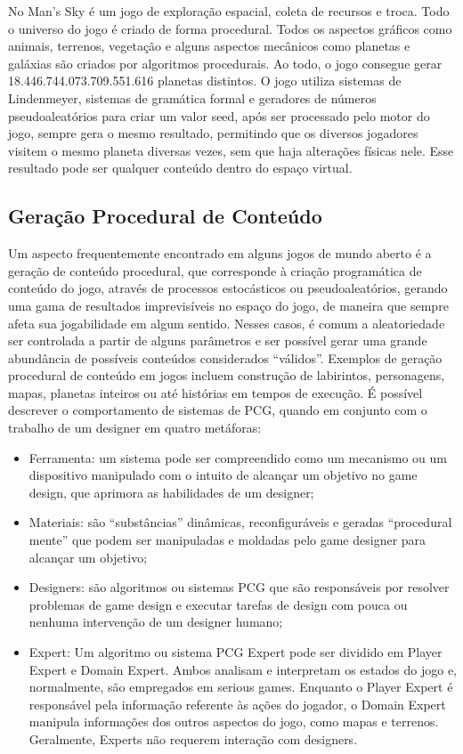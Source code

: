 \documentclass[12pt]{article}
\begin{document}
No Man’s Sky é um jogo de exploração espacial, coleta de recursos e troca. Todo o universo do jogo é criado de forma procedural. Todos os aspectos gráficos como animais, terrenos, vegetação e alguns aspectos mecânicos como planetas e galáxias são criados por algoritmos procedurais. Ao todo, o jogo consegue gerar 18.446.744.073.709.551.616 planetas distintos. O jogo utiliza sistemas de Lindenmeyer, sistemas de gramática formal e geradores de números pseudoaleatórios para criar um valor seed, após ser processado pelo motor do jogo, sempre gera o mesmo resultado, permitindo que os diversos jogadores visitem o mesmo planeta diversas vezes, sem que haja alterações físicas nele. Esse resultado pode ser qualquer conteúdo dentro do espaço virtual.



\subsection{Geração Procedural de Conteúdo}\label{sec:figs}


Um aspecto frequentemente encontrado em alguns jogos de mundo aberto é a geração de conteúdo procedural, que corresponde à criação programática de conteúdo do jogo, através de processos estocásticos ou pseudoaleatórios, gerando uma gama de resultados imprevisíveis no espaço do jogo, de maneira que sempre afeta sua jogabilidade em algum sentido. Nesses casos, é comum a aleatoriedade ser controlada a partir de alguns parâmetros e ser possível gerar uma grande abundância de possíveis conteúdos considerados “válidos”. Exemplos de geração procedural de conteúdo em jogos incluem construção de labirintos, personagens, mapas, planetas inteiros ou até histórias em tempos de execução. É possível descrever o comportamento de sistemas de PCG, quando em conjunto com o trabalho de um designer em quatro metáforas:

\begin{itemize}
	\item Ferramenta: um sistema pode ser compreendido como um mecanismo ou um dispositivo manipulado com o intuito de alcançar um objetivo no game design, que aprimora as habilidades de um designer;
	\item Materiais: são “substâncias” dinâmicas, reconfiguráveis e geradas “procedural mente” que podem ser manipuladas e moldadas pelo game designer para alcançar um objetivo;	
	\item Designers: são algoritmos ou sistemas PCG que são responsáveis por resolver problemas de game design e executar tarefas de design com pouca ou nenhuma intervenção de um designer humano;
	\item Expert: Um algoritmo ou sistema PCG Expert pode ser dividido em Player Expert e Domain Expert. Ambos analisam e interpretam os estados do jogo e, normalmente, são empregados em serious games. Enquanto o Player Expert é responsável pela informação referente às ações do jogador, o Domain Expert manipula informações dos outros aspectos do jogo, como mapas e terrenos. Geralmente, Experts não requerem interação com designers.
\end{itemize}
\end{document}
